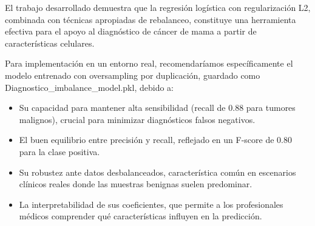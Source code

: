El trabajo desarrollado demuestra que la regresión logística con regularización L2, combinada con técnicas apropiadas de rebalanceo, constituye una herramienta efectiva para el apoyo al diagnóstico de cáncer de mama a partir de características celulares. 

Para implementación en un entorno real, recomendaríamos específicamente el modelo entrenado con oversampling por duplicación, guardado como Diagnostico\_imbalance\_model.pkl, debido a:

\begin{itemize}
    \item Su capacidad para mantener alta sensibilidad (recall de 0.88 para tumores malignos), crucial para minimizar diagnósticos falsos negativos.
    \item El buen equilibrio entre precisión y recall, reflejado en un F-score de 0.80 para la clase positiva.
    \item Su robustez ante datos desbalanceados, característica común en escenarios clínicos reales donde las muestras benignas suelen predominar.
    \item La interpretabilidad de sus coeficientes, que permite a los profesionales médicos comprender qué características influyen en la predicción.
\end{itemize}